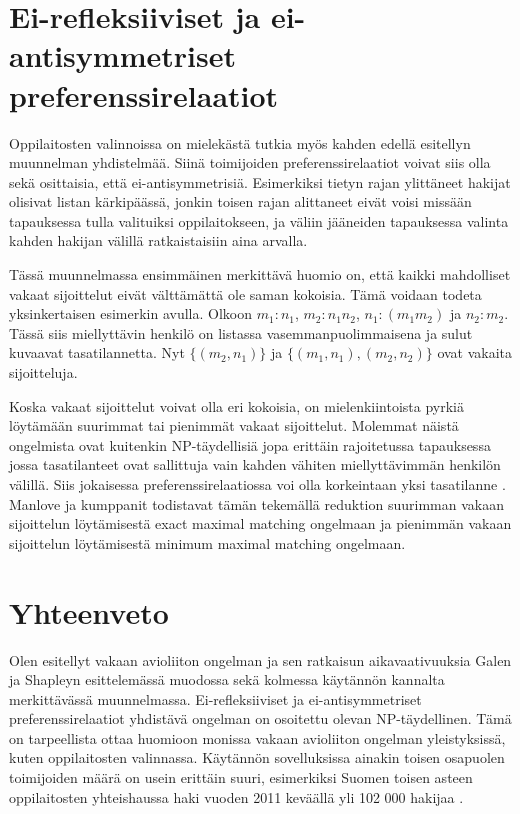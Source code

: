 \documentclass[gradu, twoside]{tktltiki}
\begin{document}
\section{Ei-refleksiiviset ja ei-antisymmetriset preferenssirelaatiot}

Oppilaitosten valinnoissa on mielekästä tutkia myös kahden edellä
esitellyn muunnelman yhdistelmää. Siinä toimijoiden
preferenssirelaatiot voivat siis olla sekä osittaisia, että
ei-antisymmetrisiä. Esimerkiksi tietyn rajan ylittäneet hakijat
olisivat listan kärkipäässä, jonkin toisen rajan alittaneet eivät
voisi missään tapauksessa tulla valituiksi oppilaitokseen, ja väliin
jääneiden tapauksessa valinta kahden hakijan välillä ratkaistaisiin
aina arvalla.

Tässä muunnelmassa ensimmäinen merkittävä huomio on, että kaikki
mahdolliset vakaat sijoittelut eivät välttämättä ole saman kokoisia.
Tämä voidaan todeta yksinkertaisen esimerkin avulla. Olkoon $m_1:
n_1$, $m_2: n_1 n_2$, $n_1: (m_1 m_2)$ ja $n_2: m_2$. Tässä siis
miellyttävin henkilö on listassa vasemmanpuolimmaisena ja sulut
kuvaavat tasatilannetta. Nyt $\{(m_2, n_1)\}$ ja $\{(m_1, n_1), (m_2,
n_2)\}$ ovat vakaita sijoitteluja. \cite{manlove02}

Koska vakaat sijoittelut voivat olla eri kokoisia, on mielenkiintoista
pyrkiä löytämään suurimmat tai pienimmät vakaat sijoittelut. Molemmat
näistä ongelmista ovat kuitenkin NP-täydellisiä jopa erittäin
rajoitetussa tapauksessa jossa tasatilanteet ovat sallittuja vain
kahden vähiten miellyttävimmän henkilön välillä. Siis jokaisessa
preferenssirelaatiossa voi olla korkeintaan yksi tasatilanne
\cite{manlove02}. Manlove ja kumppanit todistavat tämän tekemällä
reduktion suurimman vakaan sijoittelun löytämisestä exact maximal
matching ongelmaan ja pienimmän vakaan sijoittelun löytämisestä
minimum maximal matching ongelmaan.

\section{Yhteenveto}

Olen esitellyt vakaan avioliiton ongelman ja sen ratkaisun
aikavaativuuksia Galen ja Shapleyn esittelemässä muodossa sekä
kolmessa käytännön kannalta merkittävässä muunnelmassa.
Ei-refleksiiviset ja ei-antisymmetriset preferenssirelaatiot yhdistävä
ongelman on osoitettu olevan NP-täydellinen. Tämä on tarpeellista
ottaa huomioon monissa vakaan avioliiton ongelman yleistyksissä, kuten
oppilaitosten valinnassa. Käytännön sovelluksissa ainakin toisen
osapuolen toimijoiden määrä on usein erittäin suuri, esimerkiksi
Suomen toisen asteen oppilaitosten yhteishaussa haki vuoden 2011
keväällä yli 102 000 hakijaa \cite{OPH12}.
\end{document}
